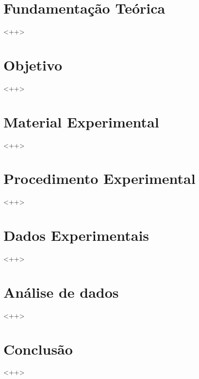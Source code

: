 \documentclass[12pt, openright, article, a4paper, brazil]{abntex2}
\begin{document}
\maketitle
\newpage

\section{Fundamentação Teórica}
<++>

\section{Objetivo}
<++>

\section{Material Experimental}
<++>

\section{Procedimento Experimental}
<++>

\section{Dados Experimentais}
<++>

\section{Análise de dados}
<++>

\section{Conclusão}
<++>


\textcite{young09}
\printbibliography
\end{document}
